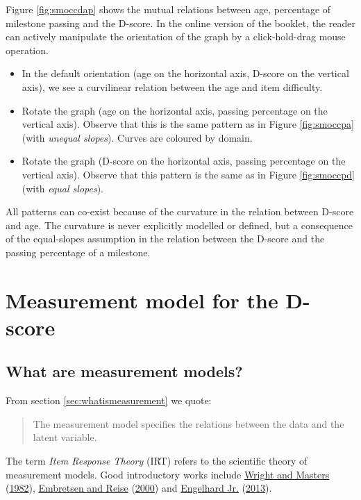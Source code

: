 \documentclass[
]{book}
\begin{document}
Figure \ref{fig:smoccdap} shows the mutual relations between age, percentage of milestone passing and the D-score. In the online version of the booklet, the reader can actively manipulate the orientation of the graph by a click-hold-drag mouse operation.

\begin{itemize}
\item
  In the default orientation (age on the horizontal axis, D-score on the vertical axis), we see a curvilinear relation between the age and item difficulty.
\item
  Rotate the graph (age on the horizontal axis, passing percentage on the vertical axis). Observe that this is the same pattern as in Figure \ref{fig:smoccpa} (with \emph{unequal slopes}). Curves are coloured by domain.
\item
  Rotate the graph (D-score on the horizontal axis, passing percentage on the vertical axis). Observe that this pattern is the same as in Figure \ref{fig:smoccpd} (with \emph{equal slopes}).
\end{itemize}

All patterns can co-exist because of the curvature in the relation between D-score and age. The curvature is never explicitly modelled or defined, but a consequence of the equal-slopes assumption in the relation between the D-score and the passing percentage of a milestone.

\hypertarget{sec:measurementmodel}{%
\section{Measurement model for the D-score}\label{sec:measurementmodel}}

\hypertarget{what-are-measurement-models}{%
\subsection{What are measurement models?}\label{what-are-measurement-models}}

From section \ref{sec:whatismeasurement} we quote:

\begin{quote}
The measurement model specifies the relations between the data and the latent variable.
\end{quote}

The term \emph{Item Response Theory} (IRT) refers to the scientific theory of measurement models. Good introductory works include \protect\hyperlink{ref-wright1982}{Wright and Masters} (\protect\hyperlink{ref-wright1982}{1982}), \protect\hyperlink{ref-embretsen2000}{Embretsen and Reise} (\protect\hyperlink{ref-embretsen2000}{2000}) and \protect\hyperlink{ref-engelhard2013}{Engelhard Jr.} (\protect\hyperlink{ref-engelhard2013}{2013}).
\end{document}

